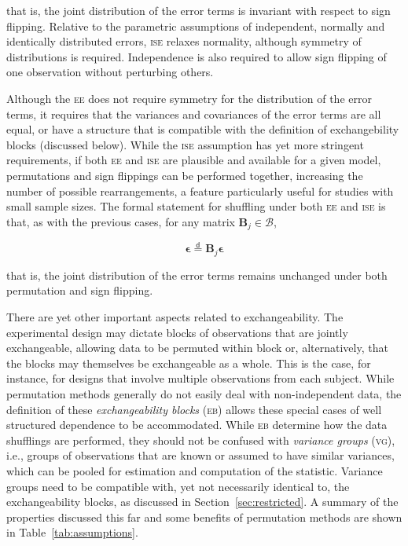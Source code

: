 \noindent
that is, the joint distribution of the error terms is invariant with respect to sign flipping. Relative to the parametric assumptions of independent, normally and identically distributed errors, \textsc{ise} relaxes normality, although symmetry of distributions is required. Independence is also required to allow sign flipping of one observation without perturbing others.

Although the \textsc{ee} does not require symmetry for the distribution of the error terms, it requires that the variances and covariances of the error terms are all equal, or have a structure that is compatible with the definition of exchangebility blocks (discussed below). While the \textsc{ise} assumption has yet more stringent requirements, if both \textsc{ee} and \textsc{ise} are plausible and available for a given model, permutations and sign flippings can be performed together, increasing the number of possible rearrangements, a feature particularly useful for studies with small sample sizes. The formal statement for shuffling under both \textsc{ee} and \textsc{ise} is that, as with the previous cases, for any matrix $\mathbf{B}_{j} \in \mathcal{B}$,

\begin{equation}
\boldsymbol{\epsilon} \stackrel{\mathsf{d}}{=} \mathbf{B}_{j}\boldsymbol{\epsilon}
\end{equation}

\noindent
that is, the joint distribution of the error terms remains unchanged under both permutation and sign flipping.

There are yet other important aspects related to exchangeability. The experimental design may dictate blocks of observations that are jointly exchangeable, allowing data to be permuted within block or, alternatively, that the blocks may themselves be exchangeable as a whole. This is the case, for instance, for designs that involve multiple observations from each subject. While permutation methods generally do not easily deal with non-independent data, the definition of these \emph{exchangeability blocks} (\textsc{eb}) allows these special cases of well structured dependence to be accommodated. While \textsc{eb} determine how the data shufflings are performed, they should not be confused with \emph{variance groups} (\textsc{vg}), i.e., groups of observations that are known or assumed to have similar variances, which can be pooled for estimation and computation of the statistic. Variance groups need to be compatible with, yet not necessarily identical to, the exchangeability blocks, as discussed in Section~\ref{sec:restricted}. A summary of the properties discussed this far and some benefits of permutation methods are shown in Table~\ref{tab:assumptions}.

